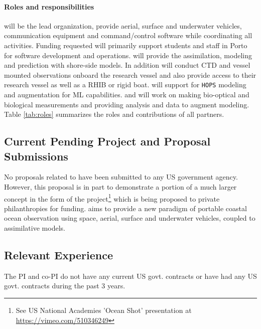 \paragraph{Roles and responsibilities} \univ will be the lead
organization, provide aerial, surface and underwater vehicles,
communication equipment and command/control software while
coordinating all activities. Funding requested will primarily support
students and staff in Porto for software development and operations.
\inst will provide the assimilation, modeling and prediction with
shore-side models. In addition \inst will conduct CTD and vessel
mounted observations onboard the research vessel and also provide
access to their research vessel as well as a RHIB or rigid boat. \mit
will support \inst for \texttt{HOPS} modeling and augmentation for ML
capabilities. \colo and \ave will work on making bio-optical and
biological measurements and providing analysis and data to augment
\inst modeling. Table \ref{tab:roles} summarizes the roles and
contributions of all partners.


\subsection{Current Pending Project and Proposal Submissions}

No proposals related to \proj have been submitted to any US government
agency. However, this proposal is in part to demonstrate a portion of
a much larger concept in the form of the \met project\footnote{See US
  National Academies 'Ocean Shot' presentation at
  \url{https://vimeo.com/510346249}} which is being proposed to
private philanthropies for funding. \met aims to provide a new
paradigm of portable coastal ocean observation using space, aerial,
surface and underwater vehicles, coupled to assimilative models.

\subsection{Relevant Experience}


The PI and co-PI do not have any current US govt. contracts or have
had any US govt. contracts during the past 3 years.
